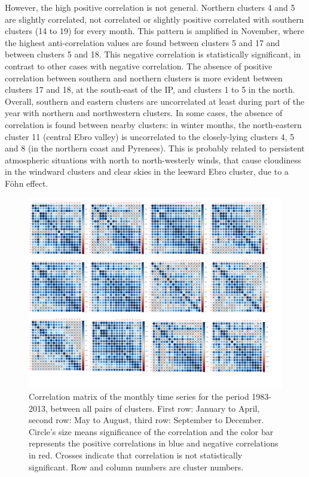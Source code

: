 However, the high positive correlation is not general. Northern clusters 4 and 5 are slightly correlated, not correlated or slightly positive correlated with southern clusters (14 to 19) for every month. This pattern is amplified in November, where the highest anti-correlation values are found between clusters 5 and 17 and between clusters 5 and 18. This negative correlation is statistically significant, in contrast to other cases with negative correlation. The absence of positive correlation between southern and northern clusters is more evident between clusters 17 and 18, at the south-east of the IP, and clusters 1 to 5 in the north. Overall, southern and eastern clusters are uncorrelated at least during part of the year with northern and northwestern clusters. In some cases, the absence of correlation is found between nearby clusters: in winter months, the north-eastern cluster 11 (central Ebro valley) is uncorrelated to the closely-lying clusters 4, 5 and 8 (in the northern coast and Pyrenees). This is probably related to persistent atmospheric situations with north to north-westerly winds, that cause cloudiness in the windward clusters and clear skies in the leeward Ebro cluster, due to a Föhn effect.


\begin{figure} [h!]
\includegraphics[scale=0.6]{figs/capitulo5/correlaciones_30.pdf}
\caption[Correlation matrix between clusters over the Iberain Peninsula]{Correlation matrix of the monthly time series for the period 1983-2013, between all pairs of clusters. First row: January to April, second row: May to August, third row: September to December. Circle’s size means significance of the correlation and the color bar represents the positive correlations in blue and negative correlations in red. Crosses indicate that correlation is not statistically significant. Row and column numbers are cluster numbers.}
\label{correlaciones_30}
\end{figure}

